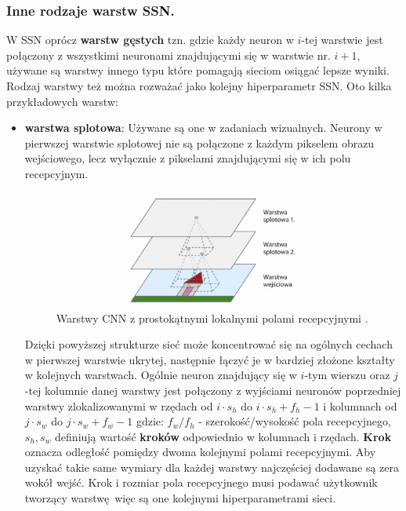 \documentclass{article}
\begin{document}
\subsubsection{Inne rodzaje warstw SSN.}
W SSN oprócz \textbf{warstw gęstych} tzn.
gdzie każdy neuron w $i$-tej warstwie jest połączony z wszystkimi neuronami
znajdującymi się w warstwie nr. $i+1$,
używane są warstwy innego typu które pomagają sieciom
osiągać lepsze wyniki. Rodzaj warstwy też można rozważać jako kolejny
hiperparametr SSN. Oto kilka przykładowych warstw:
\begin{itemize}
\item \textbf{warstwa splotowa}:
Używane są one w zadaniach wizualnych. Neurony w pierwszej warstwie splotowej nie są
połączone z każdym pikselem obrazu wejściowego, lecz wyłącznie z pikselami
znajdującymi się w ich polu recepcyjnym.

\begin{figure}[H]
\centering
\includegraphics[scale=0.6]{cnn.png}
\caption{Warstwy CNN z prostokątnymi lokalnymi polami recepcyjnymi \cite{um}.}
\end{figure}

Dzięki powyższej strukturze sieć może koncentrować się na ogólnych cechach w pierwszej warstwie
ukrytej, następnie łączyć je w bardziej złożone kształty w kolejnych warstwach. Ogólnie neuron
znajdujący się w $i$-tym wierszu oraz $j$-tej kolumnie danej warstwy jest połączony z wyjściami 
neuronów poprzedniej warstwy zlokalizowanymi w rzędach od $i \cdot s_h$ do 
$i \cdot s_h + f_h-1$  i kolumnach
od $j \cdot s_w $ do $j \cdot s_w + f_w-1$
gdzie: $f_w/f_h$ - szerokość/wysokość pola recepcyjnego, $s_h, s_w$ definiują wartość 
\textbf{kroków} odpowiednio w kolumnach i rzędach. \textbf{Krok}  oznacza odległość
pomiędzy dwoma kolejnymi polami recepcyjnymi. Aby uzyskać takie same wymiary 
dla każdej warstwy najczęściej dodawane są zera wokół wejść. Krok i rozmiar pola recepcyjnego
musi podawać użytkownik tworzący warstwę więc są one kolejnymi hiperparametrami sieci.\\


\end{itemize}
\end{document}
